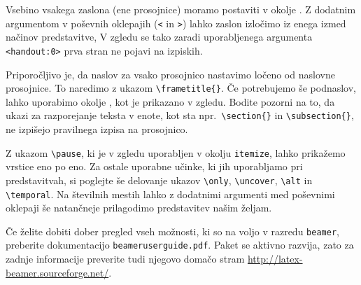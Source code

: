 Vsebino vsakega zaslona (ene prosojnice) moramo postaviti v okolje
. Z dodatnim argumentom v poševnih oklepajih
(\verb|<| in \verb|>|) lahko zaslon izločimo iz enega izmed načinov
predstavitve, V zgledu se tako zaradi uporabljenega argumenta
\verb|<handout:0>| prva stran ne pojavi na izpiskih.

Priporočljivo je, da naslov za vsako prosojnico nastavimo
ločeno od naslovne prosojnice. To naredimo z ukazom
\verb|\frametitle{}|. Če potrebujemo še podnaslov, lahko uporabimo
okolje  , kot je prikazano v zgledu. 
Bodite pozorni na to, da ukazi za razporejanje teksta v enote, kot
sta npr.~\verb|\section{}| in \verb|\subsection{}|, ne izpišejo
pravilnega izpisa na prosojnico.

Z ukazom \verb|\pause|, ki je v zgledu uporabljen
 v okolju \texttt{itemize}, lahko 
prikažemo vrstice eno po eno. Za ostale uporabne učinke, ki jih 
uporabljamo pri predstavitvah, si poglejte še delovanje ukazov \verb|\only|, \verb|\uncover|, \verb|\alt| in
\verb|\temporal|. Na številnih mestih lahko z dodatnimi argumenti
med poševnimi oklepaji še natančneje prilagodimo predstavitev našim
željam.

Če želite dobiti dober pregled vseh možnosti, ki so na voljo v 
razredu \texttt{beamer}, preberite dokumentacijo
\texttt{beameruserguide.pdf}. Paket se aktivno razvija, zato za zadnje informacije preverite
tudi njegovo domačo stram
\href{http://latex-beamer.sourceforge.net/}{http://latex-beamer.sourceforge.net/}.





